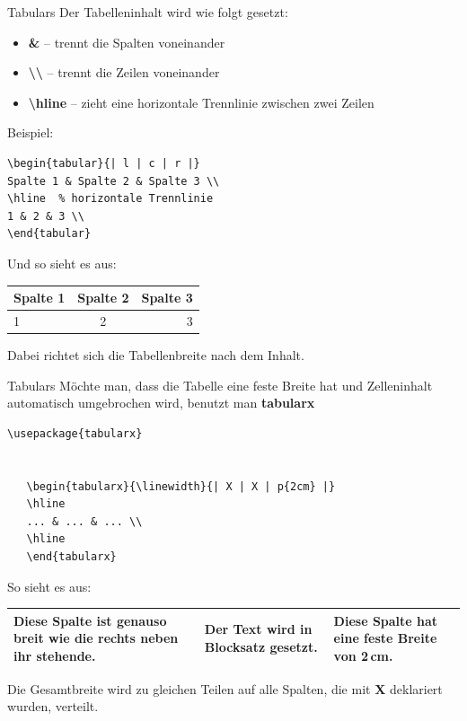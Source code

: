 \begin{frame}[fragile]{Tabulars}
Der Tabelleninhalt wird wie folgt gesetzt:
\begin{itemize}
\item \textbf{\&} -- trennt die Spalten voneinander
\item \textbf{\textbackslash\textbackslash} -- trennt die Zeilen voneinander
\item \textbf{\textbackslash hline} -- zieht eine horizontale Trennlinie zwischen zwei Zeilen
\end{itemize}

Beispiel:
\begin{lstlisting}[style=tex]
\begin{tabular}{| l | c | r |}
Spalte 1 & Spalte 2 & Spalte 3 \\
\hline  % horizontale Trennlinie
1 & 2 & 3 \\
\end{tabular}
\end{lstlisting}

\bigskip
Und so sieht es aus:
\renewcommand{\arraystretch}{1.2}
\begin{tabular}{| l | c | r |}
Spalte 1 & Spalte 2 & Spalte 3 \\
\hline
1 & 2 & 3 \\
\end{tabular}

\bigskip
Dabei richtet sich die Tabellenbreite nach dem Inhalt.
\end{frame}

\begin{frame}[fragile]{Tabulars}
Möchte man, dass die Tabelle eine feste Breite hat und Zelleninhalt automatisch umgebrochen wird, benutzt man \textbf{tabularx}
\begin{lstlisting}[style=tex]
\usepackage{tabularx}


   \begin{tabularx}{\linewidth}{| X | X | p{2cm} |}
   \hline
   ... & ... & ... \\
   \hline
   \end{tabularx}

\end{lstlisting}%

So sieht es aus:\vspace{3pt}
\begin{tabularx}{\linewidth}{| X | X | p{2cm} |}
\hline
Diese Spalte ist genauso breit wie die rechts neben ihr stehende. & Der Text wird in Blocksatz gesetzt.  & Diese Spalte hat eine feste Breite von 2\,cm. \\
\hline
\end{tabularx}

\bigskip
Die Gesamtbreite wird zu gleichen Teilen auf alle Spalten, die mit \textbf{X} deklariert wurden, verteilt.
\end{frame}

